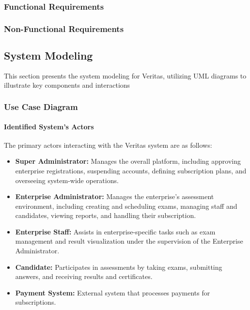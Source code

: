 \begin{landscape}
\subsubsection{Functional Requirements}

\label{sec:functional-requirements}

\vspace{1cm}

\subsubsection{Non-Functional Requirements}

\label{sec:non-functional-requirements}
\end{landscape}
\clearpage

\subsection{System Modeling}
This section presents the system modeling for Veritas, utilizing UML diagrams to illustrate key components and interactions

\subsubsection{Use Case Diagram}
\paragraph*{Identified System's Actors}
The primary actors interacting with the Veritas system are as follows:
\begin{itemize}
    \item \textbf{Super Administrator:} Manages the overall platform, including approving enterprise registrations, suspending accounts, defining subscription plans, and overseeing system-wide operations.
    \item \textbf{Enterprise Administrator:} Manages the enterprise's assessment environment, including creating and scheduling exams, managing staff and candidates, viewing reports, and handling their subscription.
    \item \textbf{Enterprise Staff:} Assists in enterprise-specific tasks such as exam management and result visualization under the supervision of the Enterprise Administrator.
    \item \textbf{Candidate:} Participates in assessments by taking exams, submitting answers, and receiving results and certificates.
    \item \textbf{Payment System:} External system that processes payments for subscriptions.
\end{itemize}

